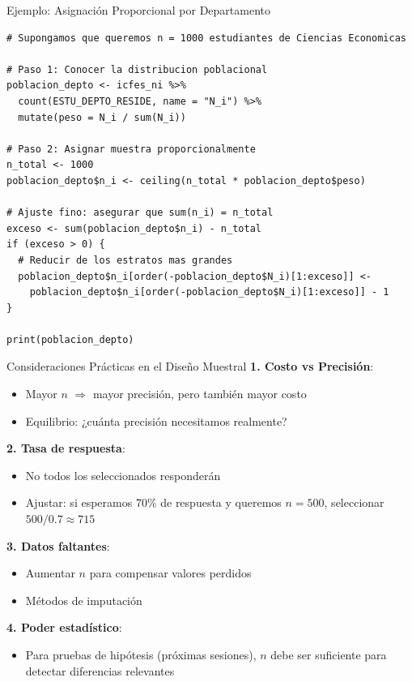 \documentclass[aspectratio=169, 11pt]{beamer}
\begin{document}
\begin{frame}[fragile]{Ejemplo: Asignación Proporcional por Departamento}
\begin{lstlisting}[basicstyle=\ttfamily\scriptsize]
# Supongamos que queremos n = 1000 estudiantes de Ciencias Economicas

# Paso 1: Conocer la distribucion poblacional
poblacion_depto <- icfes_ni %>%
  count(ESTU_DEPTO_RESIDE, name = "N_i") %>%
  mutate(peso = N_i / sum(N_i))

# Paso 2: Asignar muestra proporcionalmente
n_total <- 1000
poblacion_depto$n_i <- ceiling(n_total * poblacion_depto$peso)

# Ajuste fino: asegurar que sum(n_i) = n_total
exceso <- sum(poblacion_depto$n_i) - n_total
if (exceso > 0) {
  # Reducir de los estratos mas grandes
  poblacion_depto$n_i[order(-poblacion_depto$N_i)[1:exceso]] <-
    poblacion_depto$n_i[order(-poblacion_depto$N_i)[1:exceso]] - 1
}

print(poblacion_depto)
\end{lstlisting}
\end{frame}

\begin{frame}{Consideraciones Prácticas en el Diseño Muestral}
\textbf{1. Costo vs Precisión}:
\begin{itemize}
  \item Mayor $n$ $\Rightarrow$ mayor precisión, pero también mayor costo
  \item Equilibrio: ¿cuánta precisión necesitamos realmente?
\end{itemize}

\vspace{0.3cm}
\textbf{2. Tasa de respuesta}:
\begin{itemize}
  \item No todos los seleccionados responderán
  \item Ajustar: si esperamos 70\% de respuesta y queremos $n = 500$, seleccionar $500/0.7 \approx 715$
\end{itemize}

\vspace{0.3cm}
\textbf{3. Datos faltantes}:
\begin{itemize}
  \item Aumentar $n$ para compensar valores perdidos
  \item Métodos de imputación
\end{itemize}

\vspace{0.3cm}
\textbf{4. Poder estadístico}:
\begin{itemize}
  \item Para pruebas de hipótesis (próximas sesiones), $n$ debe ser suficiente para \alert{detectar} diferencias relevantes
\end{itemize}
\end{frame}
\end{document}

